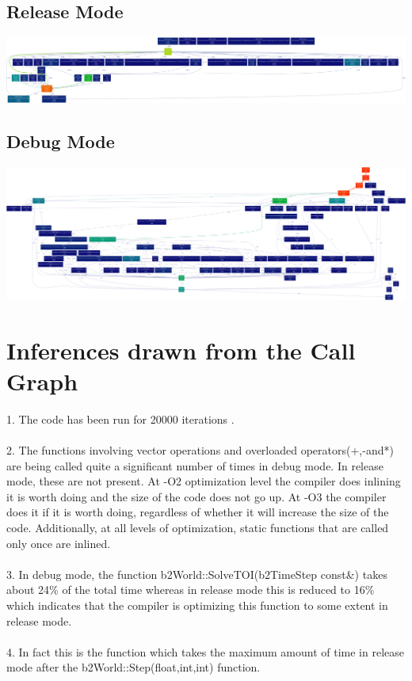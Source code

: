 \documentclass [11pt]{report}
\begin{document}
\subsection{Release Mode}
\begin{center}
\includegraphics [scale=0.10]{./images/release_output.png}
\end{center}

\subsection{Debug Mode}
\begin{center}
\includegraphics [scale=0.075]{./images/debug_output.png}
\end{center}

\section{Inferences drawn from the Call Graph}

1. The code has been run for 20000 iterations .\\ \\
2. The functions involving vector operations and overloaded operators(+,-and*) are being called quite a significant number of times in debug mode. In release mode, these are not present. At -O2 optimization level the compiler does inlining it is worth doing and the size of the code does not go up. At -O3 the compiler does it if it is worth doing, regardless of whether it will increase the size of the code. Additionally, at all levels of optimization, static functions that are called only once are inlined.\\ \\
3. In debug mode, the function b2World::SolveTOI(b2TimeStep const\&) takes about 24\% of the total time whereas in release mode this is reduced to 16\% which indicates that the compiler is optimizing this function to some extent in release mode.\\ \\
4. In fact this is the function which takes the maximum amount of time in release mode after the b2World::Step(float,int,int) function.\\
\end{document}
